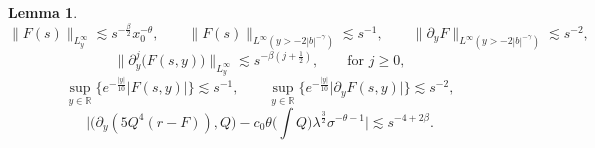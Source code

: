 \documentclass[16pt,english, oneside,reqno]{smfart}
\newcommand{\RR}{\mathbb{R}}
\newtheorem{lemma}[theorem]{Lemma}
\begin{document}
\begin{lemma}
\begin{equation}
    \end{equation}
    \begin{equation}\label{estimates_on_norms_L_infty_of_F}
        \|F(s) \|_{L^{\infty}_{y}} \lesssim s^{-\frac{\beta}{2}} x^{-\theta}_0, \qquad \|F(s)\|_{L^{\infty}(y>-2|b|^{-\gamma})} \lesssim s^{-1}, \qquad \|\partial_y F\|_{L^{\infty}(y>-2|b|^{-\gamma})} \lesssim s^{-2},
    \end{equation}
    \begin{equation}\label{estimate_on_L_infty_of_dj_F}
        \| \partial^j_y \big( F(s,y) \big) \|_{L^{\infty}_y} \lesssim s^{-\beta(j+\frac{1}{2})}, \qquad \text{for } j\geq 0,
    \end{equation}
    \begin{equation}\label{estimates_on_norms_L_infty_of_F_with_exp}
        \sup_{y\in \RR}\Big\{e^{-\frac{|y|}{10}}\lvert F(s,y) \rvert \Big\} \lesssim s^{-1}, \qquad \sup_{y\in \RR}\Big\{e^{-\frac{|y|}{10}}\lvert \partial_y F(s,y) \rvert \Big\} \lesssim s^{-2},
    \end{equation}
    \begin{equation}\label{estimates_on_scalar_prod_r_minus_F_and_Q}
        \bigg\lvert \big( \partial_y(5 Q^4(r-F)), Q \big) - c_0 \theta \Big( \int Q\Big) \lambda^{\frac{3}{2}} \sigma^{-\theta -1}\bigg\rvert \lesssim s^{-4+2\beta}.
    \end{equation}
\end{lemma}
\end{document}
